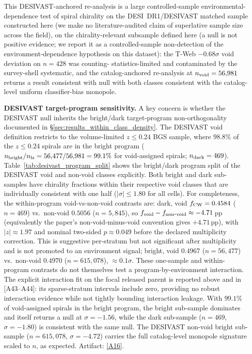 \documentclass[twocolumn,linenumbers]{aastex702}
\newcommand{\repoBase}{https://github.com/Hubify-Projects/bigbounce/blob/main}
\begin{document}
This DESIVAST-anchored re-analysis is a large controlled-sample
environmental-dependence test of spiral chirality on the DESI~DR1/DESIVAST
matched sample constructed here (we make no literature-audited
claim of superlative sample size across the field),
on the chirality-relevant subsample defined here
(a null is not positive evidence; we report it as a controlled-sample
non-detection of the environment-dependence hypothesis on this dataset):
the T-Web $-0.68\sigma$ void deviation on $n = 428$ was counting-
statistics-limited and contaminated by the survey-shell systematic,
and the catalog-anchored re-analysis at $n_{\rm void} = 56{,}981$
returns a result consistent with null with both classes consistent with the catalog-
level uniform classifier-bias monopole.

\textbf{DESIVAST target-program sensitivity.}
A key concern is whether the DESIVAST null inherits the bright/dark
target-program non-orthogonality documented in
\S\ref{sec:results_within_class_density}. The DESIVAST void definition
restricts to the volume-limited $z \leq 0.24$ BGS sample, where
$98.8\%$ of the $z \leq 0.24$ spirals are in the bright program
($n_{\rm bright}/n_{\rm lz} = 56{,}477/56{,}981 = 99.1\%$ for
void-assigned spirals; $n_{\rm dark} = 469$).
Table~\ref{tab:desivast_program_split} shows the bright/dark
program split of the DESIVAST void and non-void classes explicitly.
Both bright and dark sub-samples have chirality fractions within their
respective void classes that are individually consistent with one half
($|\sigma| \leq 1.80$ for all cells). For completeness, the
within-program void-vs-non-void contrasts are: dark, void
$f_{\rm CW}=0.4584$ ($n=469$) vs.\ non-void $0.5056$ ($n=5{,}845$), so
$f_{\rm void}-f_{\rm non\mbox{-}void}\approx-4.71$\,pp (equivalently the
paper's non-void-minus-void convention gives $+4.71$\,pp), with
$|z|\approx1.97$ and nominal two-sided $p\approx0.049$ before the declared
multiplicity correction. This is suggestive per-stratum but not significant
after multiplicity and is not promoted to an environment signal; bright, void
$0.4967$ ($n=56{,}477$) vs.\ non-void $0.4970$ ($n=615{,}078$),
${\approx}0.1\sigma$. These one-sample and within-program contrasts do
not themselves test a program-by-environment interaction. The explicit
interaction fit on the focal released parent is reported above and in
[A43--A44]: its sparse-stratum intervals include zero, providing no robust
interaction evidence while not tightly bounding interaction leakage. With
$99.1\%$ of void-assigned spirals in the bright program, the bright
sub-sample dominates and itself returns a null at $\sigma = -1.56$,
while the dark sub-sample ($n = 469$, $\sigma = -1.80$) is consistent
with the same null. The DESIVAST non-void bright sub-sample
($n = 615{,}078$, $\sigma = -4.72$) carries the full catalog-level
monopole signature scaled to $n$, as expected.
Artifact:
\href{\repoBase/pipelines/p5\_desi\_chirality/outputs/28\_ext1\_desivast\_program\_split.json}{[A16]}.
\end{document}
